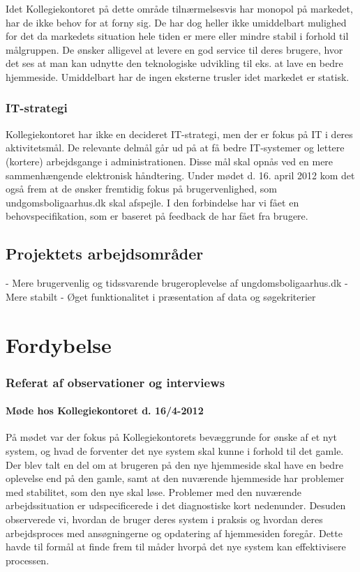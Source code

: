 \documentclass[12pt, a4paper]{report}
\begin{document}
Idet Kollegiekontoret på dette område tilnærmelsesvis har monopol på markedet, har de ikke behov for at forny sig. De har dog heller ikke umiddelbart mulighed for det da markedets situation hele tiden er mere eller mindre stabil i forhold til målgruppen. De ønsker alligevel at levere en god service til deres brugere, hvor det ses at man kan udnytte den teknologiske udvikling til eks. at lave en bedre hjemmeside. Umiddelbart har de ingen eksterne trusler idet markedet er statisk.

  \subsubsection{IT-strategi}
Kollegiekontoret har ikke en decideret IT-strategi, men der er fokus på IT i deres aktivitetsmål. De relevante delmål går ud på at få bedre IT-systemer og lettere (kortere) arbejdsgange i administrationen. Disse mål skal opnås ved en mere sammenhængende elektronisk håndtering. Under mødet d. 16. april 2012 kom det også frem at de ønsker fremtidig fokus på brugervenlighed, som undgomsboligaarhus.dk skal afspejle. I den forbindelse har vi fået en behovspecifikation, som er baseret på feedback de har fået fra brugere.

  \subsection{Projektets arbejdsområder}
- Mere brugervenlig og tidssvarende brugeroplevelse af ungdomsboligaarhus.dk \newline
- Mere stabilt \newline
- Øget funktionalitet i præsentation af data og søgekriterier \newline

\section{Fordybelse}
\subsubsection{Referat af observationer og interviews}
\paragraph{Møde hos Kollegiekontoret d. 16/4-2012}
På mødet var der fokus på Kollegiekontorets bevæggrunde for ønske af et nyt system, og hvad de forventer det nye system skal kunne i forhold til det gamle. Der blev talt en del om at brugeren på den nye hjemmeside skal have en bedre oplevelse end på den gamle, samt at den nuværende hjemmeside har problemer med stabilitet, som den nye skal løse. Problemer med den nuværende arbejdssituation er udspecificerede i det diagnostiske kort nedenunder.
Desuden observerede vi, hvordan de bruger deres system i praksis og hvordan deres arbejdsproces med ansøgningerne og opdatering af hjemmesiden foregår. Dette havde til formål at finde frem til måder hvorpå det nye system kan effektivisere processen.
\end{document}
